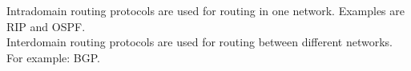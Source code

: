 Intradomain routing protocols are used for routing in one network. Examples are RIP and OSPF. \\ 
Interdomain routing protocols are used for routing between different networks. For example: BGP.

